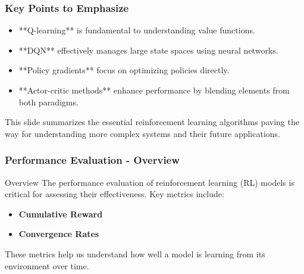 \documentclass{beamer}
\begin{document}
\begin{frame}[fragile]
    \frametitle{Key Points to Emphasize}
    \begin{itemize}
        \item **Q-learning** is fundamental to understanding value functions.
        \item **DQN** effectively manages large state spaces using neural networks.
        \item **Policy gradients** focus on optimizing policies directly.
        \item **Actor-critic methods** enhance performance by blending elements from both paradigms.
    \end{itemize}
    
    This slide summarizes the essential reinforcement learning algorithms paving the way for understanding more complex systems and their future applications.
\end{frame}

\begin{frame}[fragile]
    \frametitle{Performance Evaluation - Overview}
    \begin{block}{Overview}
        The performance evaluation of reinforcement learning (RL) models is critical for assessing their effectiveness. Key metrics include:
        \begin{itemize}
            \item \textbf{Cumulative Reward}
            \item \textbf{Convergence Rates}
        \end{itemize}
        These metrics help us understand how well a model is learning from its environment over time.
    \end{block}
\end{frame}
\end{document}
